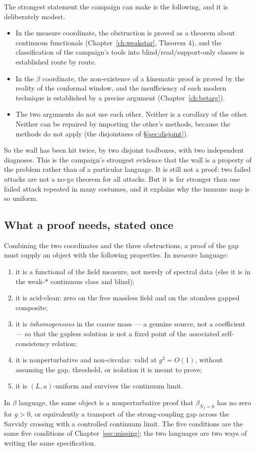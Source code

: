 The strongest statement the campaign can make is the following, and it is deliberately modest.
\begin{itemize}
\item In the measure coordinate, the obstruction is proved as a theorem about continuous
  functionals (Chapter~\ref{ch:weakstar}, Theorem 4), and the classification of the campaign's
  tools into blind/read/support-only classes is established route by route.
\item In the $\beta$ coordinate, the non-existence of a kinematic proof is proved by the reality
  of the conformal window, and the insufficiency of each modern technique is established by a
  precise argument (Chapter~\ref{ch:betarg}).
\item The two arguments do not use each other. Neither is a corollary of the other. Neither can
  be repaired by importing the other's methods, because the methods do not apply (the
  disjointness of \S\ref{sec:disjoint}).
\end{itemize}
So the wall has been hit twice, by two disjoint toolboxes, with two independent diagnoses. This
is the campaign's strongest evidence that the wall is a property of the problem rather than of a
particular language. It is still not a proof: two failed attacks are not a no-go theorem for all
attacks. But it is far stronger than one failed attack repeated in many costumes, and it explains
why the immune map is so uniform.

\subsection{What a proof needs, stated once}

Combining the two coordinates and the three obstructions, a proof of the gap must supply an
object with the following properties. In measure language:
\begin{enumerate}
\item[(P1)] it is a functional of the field measure, not merely of spectral data (else it is in
  the weak-$*$ continuous class and blind);
\item[(P2)] it is acid-clean: zero on the free massless field and on the atomless gapped
  composite;
\item[(P3)] it is \emph{inhomogeneous} in the coarse mass --- a genuine source, not a
  coefficient --- so that the gapless solution is not a fixed point of the associated
  self-consistency relation;
\item[(P4)] it is nonperturbative and non-circular: valid at $g^2=O(1)$, without assuming the
  gap, threshold, or isolation it is meant to prove;
\item[(P5)] it is $(L,a)$-uniform and survives the continuum limit.
\end{enumerate}
In $\beta$ language, the same object is a nonperturbative proof that $\beta_{N_f=0}$ has no zero
for $g>0$, or equivalently a transport of the strong-coupling gap across the Savvidy crossing
with a controlled continuum limit. The five conditions are the same five conditions of
Chapter~\ref{sec:missing}; the two languages are two ways of writing the same specification.


